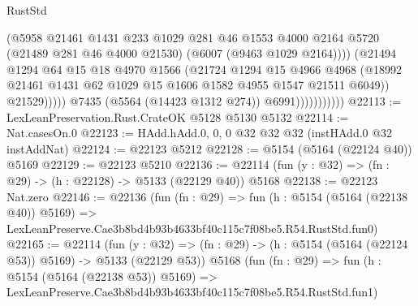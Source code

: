 \begin{lexlean}{RustStd}
\begin{coremodule}
                                    (@5958
                                      @21461
                                      @1431
                                      @233
                                      @1029
                                      @281
                                      @46
                                      @1553
                                      @4000
                                      @2164
                                      @5720
                                      (@21489 @281 @46 @4000 @21530)
                                      (@6007 (@9463 @1029 @2164))))
                                  (@21494
                                    @1294
                                    @64
                                    @15
                                    @18
                                    @4970
                                    @1566
                                    (@21724
                                      @1294
                                      @15
                                      @4966
                                      @4968
                                      (@18992
                                        @21461
                                        @1431
                                        @62
                                        @1029
                                        @15
                                        @1606
                                        @1582
                                        @4955
                                        @1547
                                        @21511
                                        @6049))
                                    @21529)))))
                          @7435
                          (@5564 (@14423 @1312 @274))
                          @6991)))))))))))
@22113 := LexLeanPreservation.Rust.CrateOK @5128 @5130 @5132
@22114 := Nat.casesOn.{0}
@22123 := HAdd.hAdd.{0, 0, 0} @32 @32 @32 (instHAdd.{0} @32 instAddNat)
@22124 := @22123 @5212
@22128 := @5154 (@5164 (@22124 @40)) @5169
@22129 := @22123 @5210
@22136 := @22114 (fun (y : @32) => (fn : @29) -> (h : @22128) -> @5133 (@22129 @40)) @5168
@22138 := @22123 Nat.zero
@22146 := @22136
    (fun (fn : @29) =>
    fun (h : @5154 (@5164 (@22138 @40)) @5169) =>
    LexLeanPreserve.Cae3b8bd4b93b4633bf40c115c7f08be5.R54.RustStd.fun0)
@22165 := @22114
    (fun (y : @32) => (fn : @29) -> (h : @5154 (@5164 (@22124 @53)) @5169) -> @5133 (@22129 @53))
    @5168
    (fun (fn : @29) =>
    fun (h : @5154 (@5164 (@22138 @53)) @5169) =>
    LexLeanPreserve.Cae3b8bd4b93b4633bf40c115c7f08be5.R54.RustStd.fun1)

\end{coremodule}
\end{lexlean}
